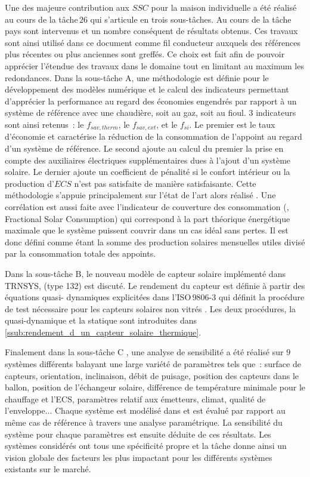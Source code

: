 Une des majeure contribution aux $SSC$ pour la maison individuelle a été réalisé au cours
de la tâche\,$26$ \parencite{Task262003} qui s’articule en trois sous-tâches. Au cours
de la tâche pays sont intervenus et un nombre conséquent de résultats obtenus.
Ces travaux sont ainsi utilisé dans ce document comme fil conducteur auxquels des
références plus récentes ou plus anciennes sont greffés. Ce choix est fait afin
de pouvoir apprécier l’étendue des travaux dans le domaine tout en limitant au
maximum les redondances.
Dans la sous-tâche A, une méthodologie est définie pour le développement des modèles
numérique et le calcul des indicateurs permettant d’apprécier la performance au regard des
économies engendrés par rapport à un système de référence avec une chaudière, soit au gaz,
soit au fioul. $3$ indicateurs sont ainsi retenus~: le $f_{sav, therm}$, le $f_{sav,
ext}$, et le $f_{si}$. Le premier est le taux d’économie et caractérise la réduction de la
consommation de l’appoint au regard d’un système de référence. Le second ajoute au calcul
du premier la prise en compte des auxiliaires électriques supplémentaires dues à l’ajout
d’un système solaire. Le dernier ajoute un coefficient de pénalité si le confort
intérieur ou la production d’$ECS$ n’est pas satisfaite de manière satisfaisante.
Cette méthodologie s’appuie principalement sur l’état de l’art alors réalisé \parencite{Task26A2002}.
Une corrélation est aussi faite avec l’indicateur de couverture des consommation
(, Fractional Solar Consumption) qui correspond à la part
théorique énergétique maximale que le système puissent couvrir dans un cas idéal sans
pertes. Il est donc défini comme étant la somme des production solaires mensuelles
utiles divisé par la consommation totale des appoints.

Dans la sous-tâche B, le nouveau modèle de capteur solaire implémenté dans TRNSYS, (type
132) est discuté. Le rendement du capteur est définie à partir des équations quasi-
dynamiques explicitées dans l’ISO\,$9806$-$3$ qui définit la procédure de test nécessaire
pour les capteurs solaires non vitrés \parencite{Task26B2002}. Les deux procédures, la
quasi-dynamique et la statique sont introduites dans \ref{ssub:rendement_d_un_capteur_solaire_thermique}.

Finalement dans la sous-tâche C \parencite{Task26C2007}, une analyse de sensibilité a été réalisé sur $9$ systèmes
différents balayant une large variété de paramètres tels que~: surface de capteurs,
orientation, inclinaison, débit de puisage, position des capteurs dans le ballon, position
de l’échangeur solaire, différence de température minimale pour le chauffage et l’ECS,
paramètres relatif aux émetteurs, climat, qualité de l’enveloppe... Chaque système est
modélisé dans  et est évalué par rapport au même cas de référence à
travers une analyse paramétrique. La sensibilité du système pour chaque paramètres est ensuite déduite de ces résultats.
Les systèmes considérés ont tous une spécificité propre et la tâche donne ainsi
un vision globale des facteurs les plus impactant pour les différents systèmes existants
sur le marché.


